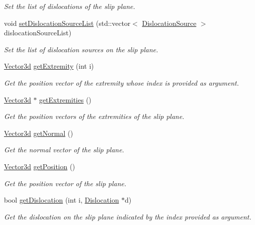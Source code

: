 \begin{DoxyCompactItemize}
\begin{DoxyCompactList}\small\item\em Set the list of dislocations of the slip plane. \end{DoxyCompactList}\item 
void \hyperlink{classSlipPlane_a6f520005b3c7e8c93df0b893201cea29}{set\-Dislocation\-Source\-List} (std\-::vector$<$ \hyperlink{classDislocationSource}{Dislocation\-Source} $>$ dislocation\-Source\-List)
\begin{DoxyCompactList}\small\item\em Set the list of dislocation sources on the slip plane. \end{DoxyCompactList}\item 
\hyperlink{classVector3d}{Vector3d} \hyperlink{classSlipPlane_ad2879c70242d30e34cc4c52d90413ef4}{get\-Extremity} (int i)
\begin{DoxyCompactList}\small\item\em Get the position vector of the extremity whose index is provided as argument. \end{DoxyCompactList}\item 
\hyperlink{classVector3d}{Vector3d} $\ast$ \hyperlink{classSlipPlane_a9d872e85ce5993f5cd6a8661fb26cac7}{get\-Extremities} ()
\begin{DoxyCompactList}\small\item\em Get the position vectors of the extremities of the slip plane. \end{DoxyCompactList}\item 
\hyperlink{classVector3d}{Vector3d} \hyperlink{classSlipPlane_ab272f2aca3f35aed68343cf02354b7ba}{get\-Normal} ()
\begin{DoxyCompactList}\small\item\em Get the normal vector of the slip plane. \end{DoxyCompactList}\item 
\hyperlink{classVector3d}{Vector3d} \hyperlink{classSlipPlane_a151558f8f223ac316f4208246d16afca}{get\-Position} ()
\begin{DoxyCompactList}\small\item\em Get the position vector of the slip plane. \end{DoxyCompactList}\item 
bool \hyperlink{classSlipPlane_a78a1ad5ab85d8ec3c3c4a7d430a0e610}{get\-Dislocation} (int i, \hyperlink{classDislocation}{Dislocation} $\ast$d)
\begin{DoxyCompactList}\small\item\em Get the dislocation on the slip plane indicated by the index provided as argument. \end{DoxyCompactList}\item 

\end{DoxyCompactItemize}

